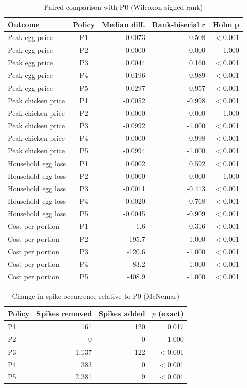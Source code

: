 \documentclass[10pt,twocolumn,a4paper]{article}
\begin{document}
\begin{table}[!htb]
\centering
\scriptsize
\caption{Paired comparison with P0 (Wilcoxon signed-rank)}\label{tab:wil}
\begin{tabularx}{\linewidth}{>{\raggedright\arraybackslash}Xcrrr}
\toprule
\textbf{Outcome} & \textbf{Policy} & \textbf{Median diff.} & \textbf{Rank-biserial r} & \textbf{Holm p} \\
\midrule
Peak egg price & P1 & 0.0073 & 0.508 & $<$0.001 \\
Peak egg price & P2 & 0.0000 & 0.000 & 1.000 \\
Peak egg price & P3 & 0.0044 & 0.160 & $<$0.001 \\
Peak egg price & P4 & -0.0196 & -0.989 & $<$0.001 \\
Peak egg price & P5 & -0.0297 & -0.957 & $<$0.001 \\
Peak chicken price & P1 & -0.0052 & -0.998 & $<$0.001 \\
Peak chicken price & P2 & 0.0000 & 0.000 & 1.000 \\
Peak chicken price & P3 & -0.0992 & -1.000 & $<$0.001 \\
Peak chicken price & P4 & 0.0000 & -0.998 & $<$0.001 \\
Peak chicken price & P5 & -0.0994 & -1.000 & $<$0.001 \\
Household egg loss & P1 & 0.0002 & 0.592 & $<$0.001 \\
Household egg loss & P2 & 0.0000 & 0.000 & 1.000 \\
Household egg loss & P3 & -0.0011 & -0.413 & $<$0.001 \\
Household egg loss & P4 & -0.0020 & -0.768 & $<$0.001 \\
Household egg loss & P5 & -0.0045 & -0.909 & $<$0.001 \\
Cost per portion & P1 & -1.6 & -0.316 & $<$0.001 \\
Cost per portion & P2 & -195.7 & -1.000 & $<$0.001 \\
Cost per portion & P3 & -120.6 & -1.000 & $<$0.001 \\
Cost per portion & P4 & -83.2 & -1.000 & $<$0.001 \\
Cost per portion & P5 & -408.9 & -1.000 & $<$0.001 \\
\bottomrule
\end{tabularx}
\end{table}

\begin{table}[!htb]
\centering
\scriptsize
\caption{Change in spike occurrence relative to P0 (McNemar)}\label{tab:mcn}
\begin{tabular}{lrrr}
\toprule
\textbf{Policy} & \textbf{Spikes removed} & \textbf{Spikes added} & \textbf{$p$ (exact)} \\
\midrule
P1 & 161 & 120 & 0.017 \\
P2 & 0 & 0 & 1.000 \\
P3 & 1,137 & 122 & $<$0.001 \\
P4 & 383 & 0 & $<$0.001 \\
P5 & 2,381 & 9 & $<$0.001 \\
\bottomrule
\end{tabular}
\end{table}
\end{document}
